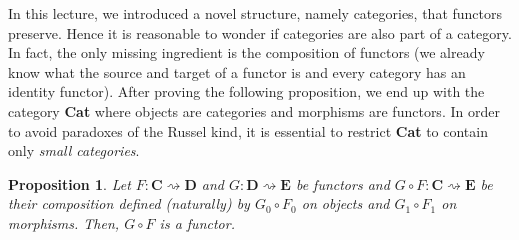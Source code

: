 \documentclass{article}
\newtheorem{prop}[thm]{Proposition}
\theoremstyle{definition}
\theoremstyle{remark}
\begin{document}
In this lecture, we introduced a novel structure, namely categories, that functors preserve. Hence it is reasonable to wonder if categories are also part of a category. In fact, the only missing ingredient is the composition of functors (we already know what the source and target of a functor is and every category has an identity functor). After proving the following proposition, we end up with the category \textbf{Cat} where objects are categories and morphisms are functors. In order to avoid paradoxes of the Russel kind, it is essential to restrict \textbf{Cat} to contain only \textit{small categories}.
\begin{prop}
	Let $F:\mathbf{C}\rightsquigarrow \mathbf{D}$ and $G: \mathbf{D}\rightsquigarrow \mathbf{E}$ be functors and $G \circ F:\mathbf{C} \rightsquigarrow \mathbf{E}$ be their composition defined (naturally) by $G_0 \circ F_0$ on objects and $G_1 \circ F_1$ on morphisms. Then, $G \circ F$ is a functor.
\end{prop}
\end{document}
